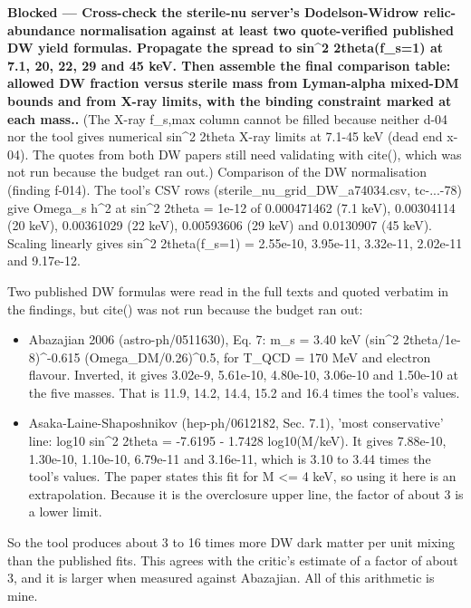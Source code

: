 \documentclass[11pt,a4paper]{article}
\begin{document}
\textbf{Blocked --- Cross-check the sterile-nu server's Dodelson-Widrow relic-abundance normalisation against at least two quote-verified published DW yield formulas. Propagate the spread to sin\textasciicircum{}2 2theta(f\_s=1) at 7.1, 20, 22, 29 and 45 keV. Then assemble the final comparison table: allowed DW fraction versus sterile mass from Lyman-alpha mixed-DM bounds and from X-ray limits, with the binding constraint marked at each mass..} (The X-ray f\_s,max column cannot be filled because neither d-04 nor the tool gives numerical sin\textasciicircum{}2 2theta X-ray limits at 7.1-45 keV (dead end x-04). The quotes from both DW papers still need validating with cite(), which was not run because the budget ran out.) Comparison of the DW normalisation (finding f-014). The tool's CSV rows (sterile\_nu\_grid\_DW\_a74034.csv, tc-...-78) give Omega\_s h\textasciicircum{}2 at sin\textasciicircum{}2 2theta = 1e-12 of 0.000471462 (7.1 keV), 0.00304114 (20 keV), 0.00361029 (22 keV), 0.00593606 (29 keV) and 0.0130907 (45 keV). Scaling linearly gives sin\textasciicircum{}2 2theta(f\_s=1) = 2.55e-10, 3.95e-11, 3.32e-11, 2.02e-11 and 9.17e-12.

Two published DW formulas were read in the full texts and quoted verbatim in the findings, but cite() was not run because the budget ran out:

\begin{itemize}
  \item Abazajian 2006 (astro-ph/0511630), Eq. 7: m\_s = 3.40 keV (sin\textasciicircum{}2 2theta/1e-8)\textasciicircum{}-0.615 (Omega\_DM/0.26)\textasciicircum{}0.5, for T\_QCD = 170 MeV and electron flavour. Inverted, it gives 3.02e-9, 5.61e-10, 4.80e-10, 3.06e-10 and 1.50e-10 at the five masses. That is 11.9, 14.2, 14.4, 15.2 and 16.4 times the tool's values.
  \item Asaka-Laine-Shaposhnikov (hep-ph/0612182, Sec. 7.1), 'most conservative' line: log10 sin\textasciicircum{}2 2theta = -7.6195 - 1.7428 log10(M/keV). It gives 7.88e-10, 1.30e-10, 1.10e-10, 6.79e-11 and 3.16e-11, which is 3.10 to 3.44 times the tool's values. The paper states this fit for M \textless{}= 4 keV, so using it here is an extrapolation. Because it is the overclosure upper line, the factor of about 3 is a lower limit.
\end{itemize}
So the tool produces about 3 to 16 times more DW dark matter per unit mixing than the published fits. This agrees with the critic's estimate of a factor of about 3, and it is larger when measured against Abazajian. All of this arithmetic is mine.
\end{document}
